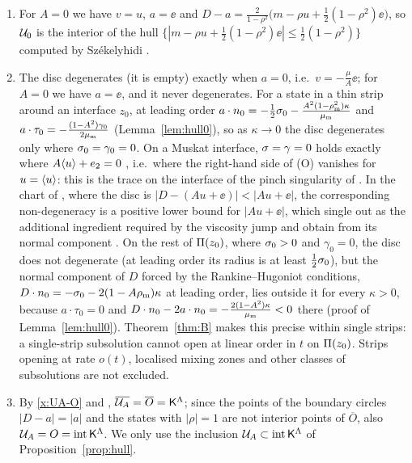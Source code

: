 \begin{remark}\label{rem:hull}
\begin{enumerate}[label=(\alph*),leftmargin=*]
\item For $A=0$ we have $v=u$, $a=\ee$ and $D-a=\frac{2}{1-\rho^2}\big(m-\rho u+\frac12(1-\rho^2)\ee\big)$, so $\mathcal{U}_0$ is the interior of the hull
$\{|m-\rho u+\frac12(1-\rho^2)\ee|\le\frac12(1-\rho^2)\}$ computed by Sz\'ekelyhidi \cite{Sze12}.
\item The disc degenerates (it is empty) exactly when $a=0$, i.e.\ $v=-\frac{\mu}{A}\ee$; for $A=0$ we have $a=\ee$, and it never degenerates. For a state in a thin strip around an interface
$z_0$, at leading order $a\cdot n_0=-\frac12\sigma_0-\frac{A^2(1-\rho_{\mathrm m}^2)\kappa}{\mu_{\mathrm m}}$ and $a\cdot\tau_0=-\frac{(1-A^2)\gamma_0}{2\mu_{\mathrm m}}$ (Lemma~\ref{lem:hull0}), so as $\kappa\to0$ the disc
degenerates only where $\sigma_0=\gamma_0=0$. On a Muskat interface, $\sigma=\gamma=0$ holds exactly where $A\langle u\rangle+e_2=0$ \cite[(3.7a)]{LM26}, i.e.\ where the right-hand side of (O)
vanishes for $u=\langle u\rangle$: this is the trace on the interface of the pinch singularity of \cite{Men22}. In the chart of \cite{Men22,LM26}, where the disc is
$|D-(Au+\ee)|<|Au+\ee|$, the corresponding non-degeneracy is a positive lower bound for $|Au+\ee|$, which \cite{LM26} single out as the additional ingredient required by
the viscosity jump and obtain from its normal component \cite[Sec.~3.3.4 and Prop.~7.4]{LM26}. On the rest of $\Pi(z_0)$, where $\sigma_0>0$ and $\gamma_0=0$, the disc does not degenerate (at leading
order its radius is at least $\frac12\sigma_0$), but the normal component of $D$ forced by the Rankine--Hugoniot conditions, $D\cdot n_0=-\sigma_0-2(1-A\rho_{\mathrm m})\kappa$ at leading order, lies outside
it for every $\kappa>0$, because $a\cdot\tau_0=0$ and $D\cdot n_0-2a\cdot n_0=-\frac{2(1-A^2)\kappa}{\mu_{\mathrm m}}<0$ there (proof of Lemma~\ref{lem:hull0}). Theorem~\ref{thm:B} makes this precise
within single strips: a single-strip subsolution cannot open at linear order in $t$ on $\Pi(z_0)$. Strips opening at rate $o(t)$, localised mixing zones and other classes of subsolutions
are not excluded.
\item By \eqref{x:UA-O} and \cite[Thm.~2.4]{LM26}, $\overline{\mathcal{U}_A}=\overline O=\mathsf{K}^\Lambda$; since the points of the boundary circles $|D-a|=|a|$ and the states with $|\rho|=1$ are not
interior points of $\overline O$, also $\mathcal{U}_A=O=\operatorname{int}\mathsf{K}^\Lambda$. We only use the inclusion $\mathcal{U}_A\subset\operatorname{int}\mathsf{K}^\Lambda$ of Proposition~\ref{prop:hull}.
\end{enumerate}
\end{remark}

